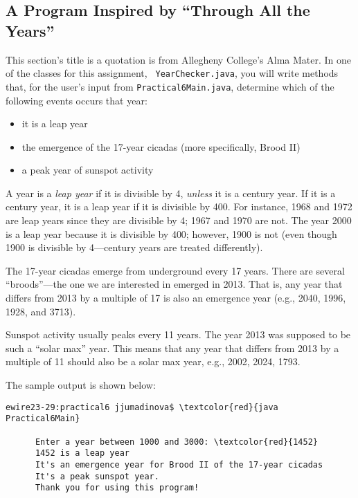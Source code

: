 \vspace*{-.1in}
\subsection*{A Program Inspired by ``Through All the Years''}
\vspace*{-.05in}

This section's title is a quotation is from Allegheny College's Alma Mater. In one of the classes for this assignment, {\tt
YearChecker.java}, you will write methods that, for the user's input from {\tt Practical6Main.java}, determine which of
the following events occurs that year: \begin{itemize}

\item
it is a leap year

\item
the emergence of the 17-year cicadas (more specifically, Brood II)

\item
a peak year of sunspot activity

\end{itemize}

\noindent A year is a {\em leap year} if it is divisible by 4, {\em unless} it is a century year. If it is a century
year, it is a leap year if it is divisible by 400. For instance, 1968 and 1972 are leap years since they are divisible
by 4; 1967 and 1970 are not.  The year 2000 is a leap year because it is divisible by 400; however, 1900 is not (even
though 1900 is divisible by 4---century years are treated differently).

\noindent The 17-year cicadas emerge from underground every 17 years. There are several ``broods''---the one we are
interested in emerged in 2013. That is, any year that differs from 2013 by a multiple of 17 is also an emergence year (e.g.,
2040, 1996, 1928, and 3713).

\noindent Sunspot activity usually peaks every 11 years. The year 2013 was supposed to be such a ``solar max'' year.
This means that any year that differs from 2013 by a multiple of 11 should also be a solar max year, e.g., 2002, 2024,
1793.

\noindent The sample output is shown below:
\begin{Verbatim}[commandchars=\\\{\}]
      ewire23-29:practical6 jjumadinova$ \textcolor{red}{java Practical6Main}
            
      Enter a year between 1000 and 3000: \textcolor{red}{1452}
      1452 is a leap year
      It's an emergence year for Brood II of the 17-year cicadas
      It's a peak sunspot year.
      Thank you for using this program! 
\end{Verbatim}

